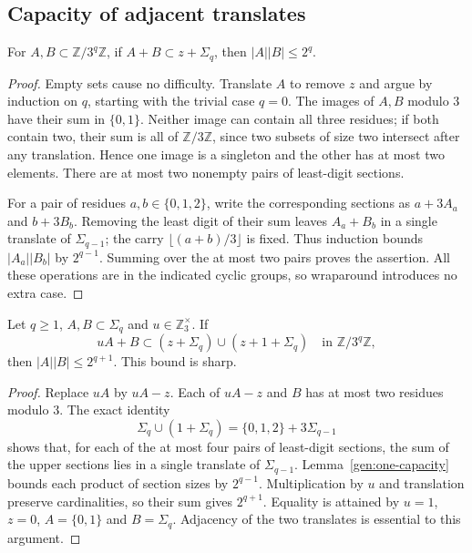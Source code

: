 \subsection{Capacity of adjacent translates}

\begin{lemma}\label{gen:one-capacity}
For $A,B\subset\mathbb Z/3^q\mathbb Z$, if
$A+B\subset z+\Sigma_q$, then $|A||B|\le2^q$.
\end{lemma}
\begin{proof}
Empty sets cause no difficulty.  Translate $A$ to remove $z$ and
argue by induction on $q$, starting with the trivial case $q=0$.
The images of $A,B$ modulo $3$ have their sum in $\{0,1\}$.
Neither image can contain all three residues; if both contain two,
their sum is all of $\mathbb Z/3\mathbb Z$, since two subsets of
size two intersect after any translation.  Hence one image is a
singleton and the other has at most two elements.  There are at most
two nonempty pairs of least-digit sections.

For a pair of residues $a,b\in\{0,1,2\}$, write the corresponding
sections as $a+3A_a$ and $b+3B_b$.  Removing the least digit of their
sum leaves $A_a+B_b$ in a single translate of $\Sigma_{q-1}$;
the carry $\lfloor(a+b)/3\rfloor$ is fixed.  Thus induction bounds
$|A_a||B_b|$ by $2^{q-1}$.  Summing over the at most two pairs
proves the assertion.  All these operations are in the indicated
cyclic groups, so wraparound introduces no extra case.
\end{proof}

\begin{lemma}
\label{gen:adjacent-capacity}
Let $q\ge1$, $A,B\subset\Sigma_q$ and $u\in\mathbb Z_3^\times$.
If
\[
 uA+B\subset (z+\Sigma_q)\cup(z+1+\Sigma_q)
                 \quad\text{in }\mathbb Z/3^q\mathbb Z,
\]
then $|A||B|\le2^{q+1}$.  This bound is sharp.
\end{lemma}
\begin{proof}
Replace $uA$ by $uA-z$.  Each of $uA-z$ and $B$ has at most two
residues modulo $3$.  The exact identity
\[
 \Sigma_q\cup(1+\Sigma_q)=\{0,1,2\}+3\Sigma_{q-1}
\]
shows that, for each of the at most four pairs of least-digit
sections, the sum of the upper sections lies in a single translate
of $\Sigma_{q-1}$.  Lemma~\ref{gen:one-capacity} bounds each product
of section sizes by $2^{q-1}$.  Multiplication by $u$ and translation
preserve cardinalities, so their sum gives $2^{q+1}$.
Equality is attained by $u=1$, $z=0$, $A=\{0,1\}$ and $B=\Sigma_q$.
Adjacency of the two translates is essential to this argument.
\end{proof}

